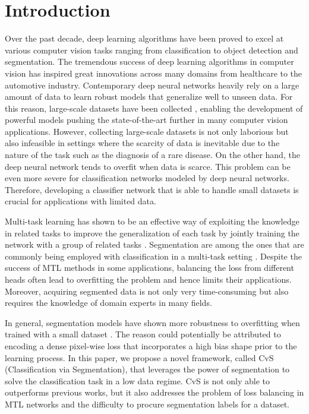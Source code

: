 \documentclass[conference]{IEEEtran}
\begin{document}
\section{Introduction}
\label{sec:intro}
Over the past decade, deep learning algorithms have been proved to excel at various computer vision tasks ranging from classification to object detection and segmentation. The tremendous success of deep learning algorithms in computer vision has inspired great innovations across many domains from healthcare to the automotive industry. Contemporary deep neural networks heavily rely on a large amount of data to learn robust models that generalize well to unseen data. For this reason, large-scale datasets have been collected \cite{deng2009imagenet,lin2014microsoft, lecun2010mnist, krizhevsky2009learning}, enabling the development of powerful models pushing the state-of-the-art further in many computer vision applications. However, collecting large-scale datasets is not only laborious but also infeasible in settings where the scarcity of data is inevitable due to the nature of the task such as the diagnosis of a rare disease. On the other hand, the deep neural network tends to overfit when data is scarce. This problem can be even more severe for classification networks modeled by deep neural networks. Therefore, developing a classifier network that is able to handle small datasets is crucial for applications with limited data. 

Multi-task learning has shown to be an effective way of exploiting the knowledge in related tasks to improve the generalization of each task by jointly training the network with a group of related tasks \cite{zhang2018overview, zhang2021survey}. Segmentation are among the ones that are commonly being employed with classification in a multi-task setting \cite{mojab2019deep}. Despite the success of MTL methods in some applications, balancing the loss from different heads often lead to overfitting the problem and hence limits their applications. Moreover, acquiring segmented data is not only very time-consuming but also requires the knowledge of domain experts in many fields. 

In general, segmentation models have shown more robustness to overfitting when trained with a small dataset \cite{ronneberger2015u, badrinarayanan2017segnet}. The reason could potentially be attributed to encoding a dense pixel-wise loss that incorporates a high bias shape prior to the learning process. In this paper, we propose a novel framework, called CvS (Classification via Segmentation), that leverages the power of segmentation to solve the classification task in a low data regime. CvS is not only able to outperforms previous works, but it also addresses the problem of loss balancing in MTL networks and the difficulty to procure segmentation labels for a dataset.
\end{document}
